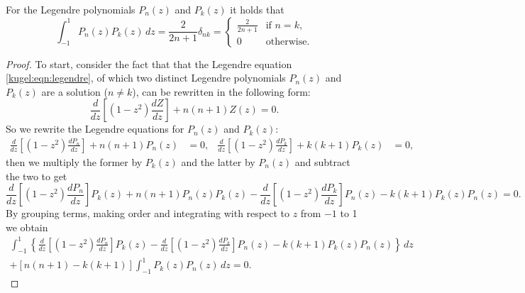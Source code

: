 \begin{lemma} For the Legendre polynomials $P_n(z)$ and $P_k(z)$ it holds that
  \label{kugel:thm:legendre-poly-ortho}
  \begin{equation*}
    \int_{-1}^1 P_n(z) P_k(z) \, dz
    = \frac{2}{2n + 1} \delta_{nk}
    = \begin{cases}
      \frac{2}{2n + 1} & \text{if } n = k, \\
      0 & \text{otherwise}.
    \end{cases}
  \end{equation*}
\end{lemma}
\begin{proof}
  To start, consider the fact that that the Legendre equation
  \eqref{kugel:eqn:legendre}, of which two distinct Legendre polynomials
  $P_n(z)$ and $P_k(z)$ are a solution ($n \neq k$), can be rewritten in the
  following form:
  \begin{equation}
    \frac{d}{dz} \left[ 
      \left( 1 - z^2 \right) \frac{dZ}{dz}
    \right] + n(n+1) Z(z) = 0.
  \end{equation}
  So we rewrite the Legendre equations for $P_n(z)$ and $P_k(z)$:
  \begin{align*}
    \frac{d}{dz} \left[ 
      \left( 1 - z^2 \right) \frac{dP_n}{dz}
    \right] + n(n+1) P_n(z) &= 0,
    &
    \frac{d}{dz} \left[ 
      \left( 1 - z^2 \right) \frac{dP_k}{dz}
    \right] + k(k+1) P_k(z) &= 0,
  \end{align*}
  then we multiply the former by $P_k(z)$ and the latter by $P_n(z)$ and
  subtract the two to get
  \begin{equation*}
    \frac{d}{dz} \left[ 
      \left( 1 - z^2 \right) \frac{dP_n}{dz}
    \right] P_k(z) + n(n+1) P_n(z) P_k(z)
    -
    \frac{d}{dz} \left[ 
      \left( 1 - z^2 \right) \frac{dP_k}{dz}
    \right] P_n(z) - k(k+1) P_k(z) P_n(z) = 0.
  \end{equation*}
  By grouping terms, making order and integrating with respect to $z$ from $-1$
  to 1 we obtain
  \begin{gather}
    \int_{-1}^1 \left\{
      \frac{d}{dz} \left[ 
        \left( 1 - z^2 \right) \frac{dP_n}{dz}
      \right] P_k(z) 
      -
      \frac{d}{dz} \left[ 
        \left( 1 - z^2 \right) \frac{dP_k}{dz}
      \right] P_n(z) - k(k+1) P_k(z) P_n(z)
    \right\} \,dz \nonumber \\
    + \left[ n(n+1) - k(k+1) \right] \int_{-1}^1 P_k(z) P_n(z) \, dz = 0.
    \label{kugel:thm:legendre-poly-ortho:proof:1}
  \end{gather}

\end{proof}
